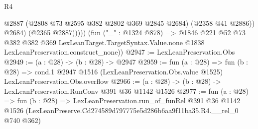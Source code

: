 \begin{lexlean}{R4}
\begin{coremodule}
                  @2887
                  (@2808 @73 @2595 @382 @2802 @369 @2845 @2684)
                  (@2358 @41 @2886))
                @2684)
              (@2365 @2887)))))
      (fun ("_" : @1324 @878) =>
      @1846
        @221
        @52
        @73
        @382
        @382
        @369
        LexLeanTarget.TargetSyntax.Value.none
        @1838
        LexLeanPreservation.construct_none))
@2947 := LexLeanPreservation.Obs
@2949 := (a : @28) -> (b : @28) -> @2947
@2959 := fun (a : @28) =>
  fun (b : @28) =>
  cond.{1} @2947 @1516 (LexLeanPreservation.Obs.value @1525) LexLeanPreservation.Obs.overflow
@2966 := (a : @28) -> (b : @28) -> LexLeanPreservation.RunConv @391 @36 @1142 @1526
@2977 := fun (a : @28) =>
  fun (b : @28) =>
  LexLeanPreservation.run_of_funRel
    @391
    @36
    @1142
    @1526
    (LexLeanPreserve.Cd274589d797775e5d286b6aa9f11ba35.R4.__rel_0 @740 @362)
\end{coremodule}
\end{lexlean}
